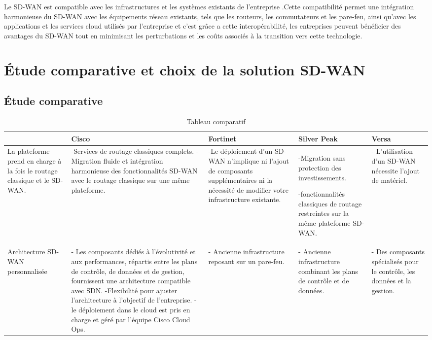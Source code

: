 Le SD-WAN est compatible avec les infrastructures et les systèmes existants de l'entreprise .Cette compatibilité permet une intégration harmonieuse du SD-WAN avec les équipements réseau existants, tels que les routeurs, les commutateurs et les pare-feu, ainsi qu'avec les applications et les services cloud utilisés par l'entreprise et c’est grâce a cette interopérabilité, les entreprises peuvent bénéficier des avantages du SD-WAN tout en minimisant les perturbations et les coûts associés à la transition vers cette technologie.

\section{Étude comparative et choix de la solution SD-WAN   }
\subsection{Étude comparative  }
\begin{table}[H]
	\begin{center}
		\caption{Tableau comparatif  }
		
		\hspace*{-0.5 cm}	\begin{tabular}{|p{3cm}|p{3cm}|p{3cm}|p{3cm}|p{3cm}|}
			\hline
			\centering
			& Cisco & Fortinet & Silver Peak & Versa\\
			\hline
			\centering
			
			La plateforme prend en charge à la fois le routage classique et le SD-WAN. & -Services de routage classiques complets.
			- Migration fluide et intégration harmonieuse des fonctionnalités SD-WAN avec le routage classique sur une même plateforme.
			& -Le déploiement d'un SD-WAN n'implique ni l'ajout de composants supplémentaires ni la nécessité de modifier votre infrastructure existante. & -Migration sans protection des investissements.
			
			-fonctionnalités classiques de routage restreintes sur la même plateforme SD-WAN.
			& - L'utilisation d'un SD-WAN nécessite l'ajout de matériel. \\
			
			\hline
			
			
			\centering
			Architecture SD-WAN personnalisée& - Les composants dédiés à l'évolutivité et aux performances, répartis entre les plans de contrôle, de données et de gestion, fournissent une architecture compatible avec SDN.
			-Flexibilité pour ajuster l'architecture à l'objectif de l'entreprise.
			- le déploiement dans le cloud est pris en charge et géré par l'équipe Cisco Cloud Ops.
			&- Ancienne infrastructure reposant sur un pare-feu.&- Ancienne infrastructure combinant les plans de contrôle et de données.&- Des composants spécialisés pour le contrôle, les données et la gestion.
			\\
			\hline
		\end{tabular}
	\end{center}
\end{table}	
